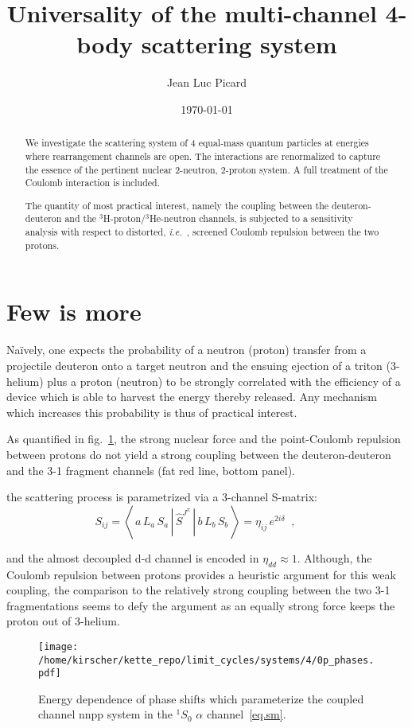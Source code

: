 \documentclass[onecolumn,preprint,superscriptaddress,nofootinbib,notitlepage,10pt,linenumbers]{revtex4-1}
\newcommand{\ie}{\textit{i.e.}~}
\newcommand{\be}{\begin{equation}}
\newcommand{\ee}{\end{equation}}
\newcommand{\la}{\label}
\newcommand{\figref}[1]{fig.~\ref{#1}}
\newcommand{\me}[3] {\left\langle\,#1\,\left|\left.\,#2\,\right|\,#3\,\right.\right\rangle}
\begin{document}
\title{Universality of the multi-channel 4-body scattering system}
\author{Jean Luc Picard}
\date{\today}

\begin{abstract}
We investigate the scattering system of 4 equal-mass quantum particles at energies
where rearrangement channels are open. The interactions are renormalized to capture
the essence of the pertinent nuclear 2-neutron, 2-proton system. A full
treatment of the Coulomb interaction is included.

The quantity of most practical interest, namely the coupling between the deuteron-deuteron
and the ${}^3$H-proton/${}^3$He-neutron channels, is subjected to a sensitivity analysis
with respect to distorted, \ie, screened Coulomb repulsion between the two protons.
\end{abstract}

\maketitle

\section{Few is more}

Na\"ively, one expects the probability of a neutron (proton) transfer from a projectile deuteron onto a target neutron
and the ensuing ejection of a triton (3-helium) plus a proton (neutron) to be strongly correlated with the
efficiency of a device which is able to harvest the energy thereby released. Any mechanism which increases this probability
is thus of practical interest.

As quantified in \figref{fig.dd-phases}, the strong nuclear force and the point-Coulomb repulsion between protons
do not yield a strong coupling between the deuteron-deuteron and the 3-1 fragment channels (fat red line, bottom panel).

the scattering process is parametrized via a 3-channel S-matrix:
\be
\la{eq.sm}
S_{ij}=\me{a\,L_a\,S_a}{\hat{S}^{J^\pi}}{b\,L_b\,S_b}=\eta_{ij}\,e^{2i\delta}
\;\;,\qquad
\ee

and the almost decoupled d-d channel is encoded in $\eta_{dd}\approx 1$. Although, the Coulomb repulsion between protons
provides a heuristic argument for this weak coupling, the comparison to the relatively strong coupling between the two 3-1
fragmentations seems to defy the argument as an equally strong force keeps the proton out of 3-helium.

\begin{figure}[tb]
\centerline{\texttt{[image: /home/kirscher/kette\_repo/limit\_cycles/systems/4/0p\_phases.pdf]}}
\caption{\label{fig.dd-phases} Energy dependence of phase shifts which parameterize the coupled channel
nnpp system in the ${}^1S_0$ $\alpha$ channel~\eqref{eq.sm}.
}
\end{figure}


\end{document}
